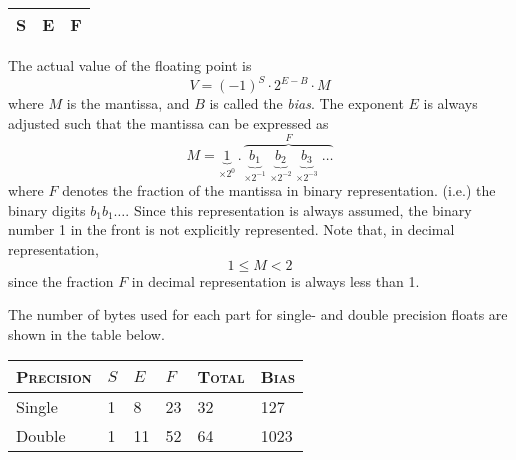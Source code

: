 \vspace{1em}

\begin{center}
  \begin{tabular}{|c|c|c|}
    \hline
    S & \hspace{4em} E \hspace{4em} & \hspace{8em} F \hspace{8em} \\
    \hline
  \end{tabular}
\end{center}

The actual value of the floating point is
\begin{equation}
  V = (-1)^S \cdot 2^{E-B} \cdot M \label{eq:float_value}
\end{equation}
where $M$ is the mantissa, and $B$ is called the \emph{bias}. The exponent $E$ is always adjusted such that the mantissa can be expressed as
\begin{equation}
  M = \underset{\times 2^0}{\underbrace{1}} \, . \,
                                              \overset{F}{
                                                \overbrace{
                                                  \underset{\times 2^{-1}}{\underbrace{b_1}} \;
                                                  \underset{\times 2^{-2}}{\underbrace{b_2}} \;
                                                  \underset{\times 2^{-3}}{\underbrace{b_3}} \;
                                                  \dots
                                                }
                                              }
\end{equation}
where $F$ denotes the fraction of the mantissa in binary representation. (i.e.) the binary digits $b_1b_1\dots$. Since this representation is always assumed, the binary number 1 in the front is not explicitly represented. Note that, in decimal representation,
\begin{equation}
  1 \leq M < 2
\end{equation}
since the fraction $F$ in decimal representation is always less than 1.

The number of bytes used for each part for single- and double precision floats are shown in the table below.

\vspace*{1em}
\begin{center}
    \begin{tabular}{lllll|l}
      \toprule
      \textsc{Precision} & $S$ & $E$ & $F$ & \textsc{Total} & \textsc{Bias} \\
      \midrule
      Single & 1 & 8  & 23 & 32 & 127 \\
      Double & 1 & 11 & 52 & 64 & 1023 \\
      \bottomrule
  \end{tabular}
\end{center}


